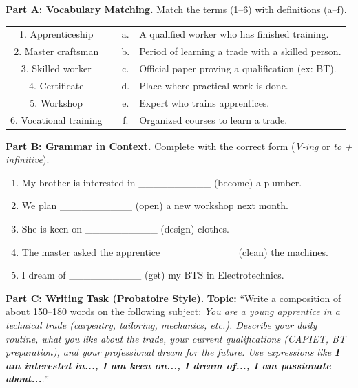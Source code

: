 \documentclass[11pt]{article}
\begin{document}
\begin{exercice}
\textbf{Part A: Vocabulary Matching.} Match the terms (1--6) with definitions (a--f).
\begin{center}
\begin{tabular}{|c|l|c|l|}
\hline
1. Apprenticeship & \hfill & a. & A qualified worker who has finished training. \\
2. Master craftsman & & b. & Period of learning a trade with a skilled person. \\
3. Skilled worker & & c. & Official paper proving a qualification (ex: BT). \\
4. Certificate & & d. & Place where practical work is done. \\
5. Workshop & & e. & Expert who trains apprentices. \\
6. Vocational training & & f. & Organized courses to learn a trade. \\
\hline
\end{tabular}
\end{center}

\textbf{Part B: Grammar in Context.} Complete with the correct form (\emph{V-ing} or \emph{to + infinitive}).
\begin{enumerate}
    \item My brother is interested in \_\_\_\_\_\_\_\_\_\_ (become) a plumber.
    \item We plan \_\_\_\_\_\_\_\_\_\_ (open) a new workshop next month.
    \item She is keen on \_\_\_\_\_\_\_\_\_\_ (design) clothes.
    \item The master asked the apprentice \_\_\_\_\_\_\_\_\_\_ (clean) the machines.
    \item I dream of \_\_\_\_\_\_\_\_\_\_ (get) my BTS in Electrotechnics.
\end{enumerate}

\textbf{Part C: Writing Task (Probatoire Style).}
\textbf{Topic:} ``Write a composition of about 150--180 words on the following subject: \emph{You are a young apprentice in a technical trade (carpentry, tailoring, mechanics, etc.). Describe your daily routine, what you like about the trade, your current qualifications (CAPIET, BT preparation), and your professional dream for the future. Use expressions like \textbf{I am interested in..., I am keen on..., I dream of..., I am passionate about...}.}''
\end{exercice}
\end{document}
